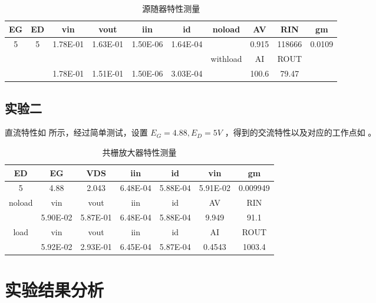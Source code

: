 \documentclass[lang=cn,11pt,a4paper,cite=authoryear]{elegantpaper}
\begin{document}
\begin{table}[htb]
    \centering
    \caption{源随器特性测量}
    \label{t1}
    \begin{tabular}{|c|c|c|c|c|c|c|c|c|c|}
    \hline
    EG & ED & vin      & vout     & iin      & id       & noload   & AV          & RIN         & gm          \\ \hline
    5  & 5  & 1.78E-01 & 1.63E-01 & 1.50E-06 & 1.64E-04 &          & 0.915 & 118666 & 0.0109 \\ \hline
       &    &          &          &          &          & withload & AI          & ROUT        &             \\ \hline
       &    & 1.78E-01 & 1.51E-01 & 1.50E-06 & 3.03E-04 &          & 100.6 & 79.47 &             \\ \hline
    \end{tabular}
\end{table}

\subsection{实验二}



直流特性如  所示，经过简单测试，设置 \(E_G = 4.88 ,E_D = 5 V\) ，得到的交流特性以及对应的工作点如  。

\begin{table}[htb]
    \centering
    \caption{共栅放大器特性测量}
    \label{t2}
    \begin{tabular}{|c|c|c|c|c|c|c|}
    \hline
    ED     & EG       & VDS      & iin      & id       & vin         & gm          \\ \hline
    5      & 4.88     & 2.043    & 6.48E-04 & 5.88E-04 & 5.91E-02    & 0.009949 \\ \hline
    noload & vin      & vout     & iin      & id       & AV          & RIN         \\ \hline
           & 5.90E-02 & 5.87E-01 & 6.48E-04 & 5.88E-04 & 9.949 & 91.1 \\ \hline
    load   & vin      & vout     & iin      & id       & AI          & ROUT        \\ \hline
           & 5.92E-02 & 2.93E-01 & 6.45E-04 & 5.87E-04 & 0.4543 & 1003.4 \\ \hline
    \end{tabular}
\end{table}

\section{实验结果分析}
\end{document}
